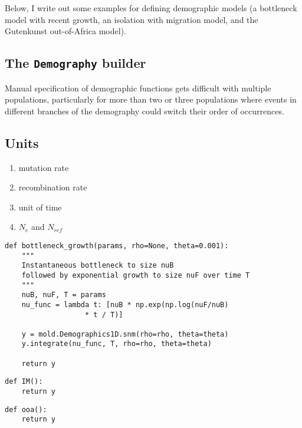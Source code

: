 \documentclass[11pt]{article}
\makeatletter
\newcommand{\py}[1]{\lstinline[breaklines=true,language=Python, showstringspaces=False]@#1@}
\makeatother
\begin{document}
Below, I write out some examples for defining demographic models (a bottleneck model with recent growth, an isolation with migration model, and the Gutenkunst out-of-Africa model).

\subsection{The \texttt{Demography} builder}

Manual specification of demographic functions gets difficult with multiple populations, particularly for more than two or three populations where events in different branches of the demography could switch their order of occurrences.

\subsection{Units}
\begin{enumerate}
\item mutation rate
\item recombination rate
\item unit of time
\item $N_e$ and $N_{ref}$
\end{enumerate}

\clearpage

\begin{lstlisting}[caption={\textbf{Bottleneck model:} At time \py{T} in the past, an equilibrium population goes through a bottleneck of depth \py{nuB}, recovering to relative size \py{nuF} through exponential growth. In all examples listed here, we need to \py{import numpy as np} and \py{import moments.LD as mold}.}, float, label={lst:bottleneck}]
def bottleneck_growth(params, rho=None, theta=0.001):
    """
    Instantaneous bottleneck to size nuB
    followed by exponential growth to size nuF over time T
    """
    nuB, nuF, T = params
    nu_func = lambda t: [nuB * np.exp(np.log(nuF/nuB) 
    			   * t / T)]

    y = mold.Demographics1D.snm(rho=rho, theta=theta)
    y.integrate(nu_func, T, rho=rho, theta=theta)

    return y
\end{lstlisting}

\begin{lstlisting}[caption={\textbf{IM model:}}, float, label={lst:IM}]
def IM():
    return y
\end{lstlisting}

\begin{lstlisting}[caption={\textbf{Out of Africa model:}}, float, label={lst:IM}]
def ooa():
    return y
\end{lstlisting}
\end{document}
